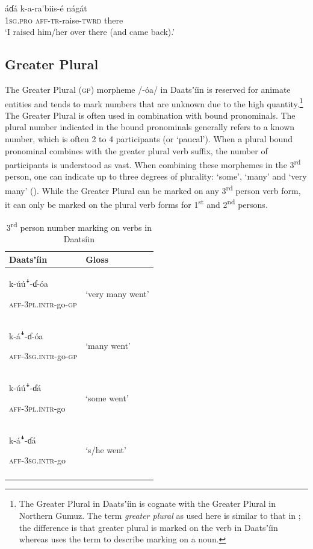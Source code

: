 \documentclass[output=paper]{langsci/langscibook}
\begin{document}
\ea\label{ex:ahlandc:20}
\gll 
\'{a}ɗ\'{a}  k-a-ra\'{ }biis-\'{e} n\'{a}g\'{a}t\footnotemark \\
\textsc{1sg.pro}  \textsc{aff-tr}{}-raise-\textsc{twrd}  there \\
\glt
‘I raised him/her over there (and came back).’ 
\z 
{}

\subsection{Greater Plural}\label{sec:ahlandc:4.3}

The Greater Plural (\textsc{gp}) morpheme /-\'{o}a/ in Daatsʼ\'{i}in is reserved for animate entities and tends to mark numbers that are unknown due to the high quantity.\footnote{The Greater Plural in Daatsʼ\'{i}in is cognate with the Greater Plural in Northern Gumuz. The term \textit{greater plural} as used here is similar to that in \citet{Corbett2000}; the difference is that greater plural is marked on the verb in Daatsʼ\'{i}in whereas \citet{Corbett2000} uses the term to describe marking on a noun.} The Greater Plural is often used in combination with bound pronominals. The plural number indicated in the bound pronominals generally refers to a known number, which is often 2 to 4 participants (or ‘paucal’).  When a plural bound pronominal combines with the greater plural verb suffix, the number of participants is understood as vast. When combining these morphemes in the 3\textsuperscript{rd} person, one can indicate up to three degrees of plurality: ‘some’, ‘many’ and ‘very many’ (). While the Greater Plural can be marked on any 3\textsuperscript{rd} person verb form, it can only be marked on the plural verb forms for 1\textsuperscript{st} and 2\textsuperscript{nd} persons.

\begin{table}

\begin{tabularx}{\textwidth}{XX}
\lsptoprule
Daatsʼ\'{i}in & Gloss\\
\midrule
{k-\'{u}\'{u}\textsf{ꜜ}-ɗ{}-\'{o}a}

\textsc{aff-3pl.intr}{}-go-\textsc{gp} & ‘very many went’\\
{k-\'{a}\textsf{ꜜ}-ɗ{}-\'{o}a}

\textsc{aff-3sg.intr}{}-go-\textsc{gp} & ‘many went’\\
{k-\'{u}\'{u}\textsf{ꜜ}-ɗ\'{a}}

\textsc{aff-3pl.intr}{}-go & ‘some went’\\
{k-\'{a}\textsf{ꜜ}-ɗ\'{a}}

\textsc{aff-3sg.intr}{}-go & ‘s/he went’\\
\lspbottomrule
\end{tabularx}
\caption{3\textsuperscript{rd} person number marking on verbs in Daats\'{i}in}
\label{tab:ahlandc:5}
\end{table}
\end{document}

